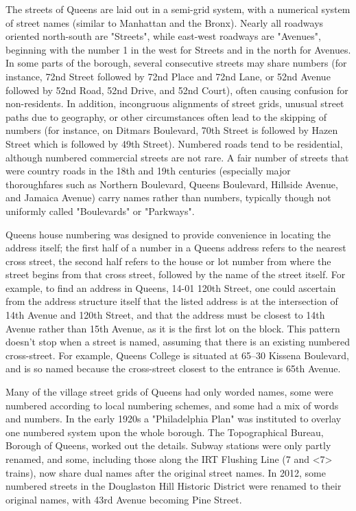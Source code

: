 The streets of Queens are laid out in a semi-grid system, with a
numerical system of street names (similar to Manhattan and the Bronx).
Nearly all roadways oriented north-south are "Streets", while east-west
roadways are "Avenues", beginning with the number 1 in the west for
Streets and in the north for Avenues. In some parts of the borough,
several consecutive streets may share numbers (for instance, 72nd Street
followed by 72nd Place and 72nd Lane, or 52nd Avenue followed by 52nd
Road, 52nd Drive, and 52nd Court), often causing confusion for
non-residents. In addition, incongruous alignments of street grids,
unusual street paths due to geography, or other circumstances often lead
to the skipping of numbers (for instance, on Ditmars Boulevard, 70th
Street is followed by Hazen Street which is followed by 49th Street).
Numbered roads tend to be residential, although numbered commercial
streets are not rare. A fair number of streets that were country roads
in the 18th and 19th centuries (especially major thoroughfares such as
Northern Boulevard, Queens Boulevard, Hillside Avenue, and Jamaica
Avenue) carry names rather than numbers, typically though not uniformly
called "Boulevards" or "Parkways".

Queens house numbering was designed to provide convenience in locating
the address itself; the first half of a number in a Queens address
refers to the nearest cross street, the second half refers to the house
or lot number from where the street begins from that cross street,
followed by the name of the street itself. For example, to find an
address in Queens, 14-01 120th Street, one could ascertain from the
address structure itself that the listed address is at the intersection
of 14th Avenue and 120th Street, and that the address must be closest to
14th Avenue rather than 15th Avenue, as it is the first lot on the
block. This pattern doesn't stop when a street is named, assuming that
there is an existing numbered cross-street. For example, Queens College
is situated at 65--30 Kissena Boulevard, and is so named because the
cross-street closest to the entrance is 65th Avenue.

Many of the village street grids of Queens had only worded names, some
were numbered according to local numbering schemes, and some had a mix
of words and numbers. In the early 1920s a "Philadelphia Plan" was
instituted to overlay one numbered system upon the whole borough. The
Topographical Bureau, Borough of Queens, worked out the details. Subway
stations were only partly renamed, and some, including those along the
IRT Flushing Line (7 and \textless{}7\textgreater{}​ trains), now share
dual names after the original street names. In 2012, some numbered
streets in the Douglaston Hill Historic District were renamed to their
original names, with 43rd Avenue becoming Pine Street.

